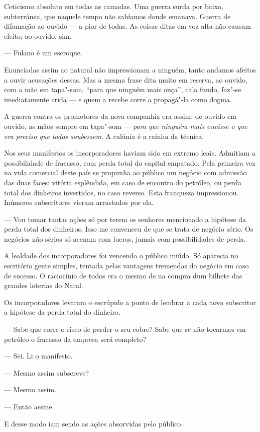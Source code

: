 Ceticismo absoluto em todas as camadas. Uma guerra surda por baixo,
subterrânea, que naquele tempo não sabíamos donde emanava. Guerra de
difamação ao ouvido --- a pior de todas. As coisas ditas em voz alta não
causam efeito; ao ouvido, sim.

--- Fulano é um escroque.

Enunciadas assim ao natural não impressionam a ninguém, tanto andamos
afeitos a ouvir acusações dessas. Mas a mesma frase dita muito em
reserva, ao ouvido, com a mão em tapa"-som, ``para que ninguém mais
ouça'', cala fundo, faz"-se imediatamente crida --- e quem a recebe corre
a propagá"-la como dogma.

A guerra contra os promotores da nova companhia era assim: de ouvido em
ouvido, as mãos sempre em tapa"-som --- \emph{para que ninguém mais
ouvisse o que era preciso que todos soubessem}. A calúnia é a rainha da
técnica.

Nos seus manifestos os incorporadores haviam sido em extremo leais.
Admitiam a possibilidade de fracasso, com perda total do capital
empatado. Pela primeira vez na vida comercial deste país se propunha ao
público um negócio com admissão das duas faces: vitória esplêndida, em
caso de encontro do petróleo, ou perda total dos dinheiros invertidos,
no caso reverso. Esta franqueza impressionou. Inúmeros subscritores
vieram arrastados por ela.

--- Vou tomar tantas ações só por terem os senhores mencionado a
hipótese da perda total dos dinheiros. Isso me convenceu de que se trata
de negócio sério. Os negócios não sérios só acenam com lucros, jamais
com possibilidades de perda.

A lealdade dos incorporadores foi vencendo o público miúdo. Só aparecia
no escritório gente simples, tentada pelas vantagens tremendas do
negócio em caso de sucesso. O raciocínio de todos era o mesmo de na
compra dum bilhete das grandes loterias do Natal.

Os incorporadores levaram o escrúpulo a ponto de lembrar a cada novo
subscritor a hipótese da perda total do dinheiro.

--- Sabe que corre o risco de perder o seu cobre? Sabe que se não
tocarmos em petróleo o fracasso da empresa será completo?

--- Sei. Li o manifesto.

--- Mesmo assim subscreve?

--- Mesmo assim.

--- Então assine.

E desse modo iam sendo as ações absorvidas pelo público.

